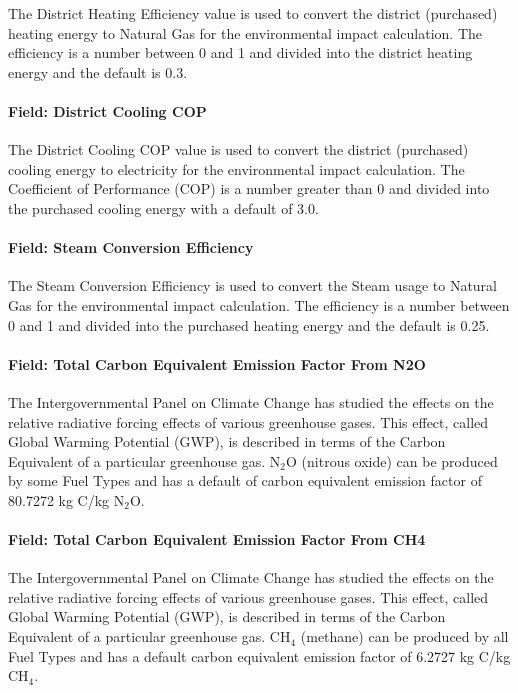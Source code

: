 The District Heating Efficiency value is used to convert the district (purchased) heating energy to Natural Gas for the environmental impact calculation. The efficiency is a number between 0 and 1 and divided into the district heating energy and the default is 0.3.

\paragraph{Field: District Cooling COP}\label{field-district-cooling-cop}

The District Cooling COP value is used to convert the district (purchased) cooling energy to electricity for the environmental impact calculation. The Coefficient of Performance (COP) is a number greater than 0 and divided into the purchased cooling energy with a default of 3.0.

\paragraph{Field: Steam Conversion Efficiency}\label{field-steam-conversion-efficiency}

The Steam Conversion Efficiency is used to convert the Steam usage to Natural Gas for the environmental impact calculation. The efficiency is a number between 0 and 1 and divided into the purchased heating energy and the default is 0.25.

\paragraph{Field: Total Carbon Equivalent Emission Factor From N2O}\label{field-total-carbon-equivalent-emission-factor-from-n2o}

The Intergovernmental Panel on Climate Change has studied the effects on the relative radiative forcing effects of various greenhouse gases. This effect, called Global Warming Potential (GWP), is described in terms of the Carbon Equivalent of a particular greenhouse gas. N\(_{2}\)O (nitrous oxide) can be produced by some Fuel Types and has a default of carbon equivalent emission factor of 80.7272 kg C/kg N\(_{2}\)O.

\paragraph{Field: Total Carbon Equivalent Emission Factor From CH4}\label{field-total-carbon-equivalent-emission-factor-from-ch4}

The Intergovernmental Panel on Climate Change has studied the effects on the relative radiative forcing effects of various greenhouse gases. This effect, called Global Warming Potential (GWP), is described in terms of the Carbon Equivalent of a particular greenhouse gas. CH\(_{4}\) (methane) can be produced by all Fuel Types and has a default carbon equivalent emission factor of 6.2727 kg C/kg CH\(_{4}\).

